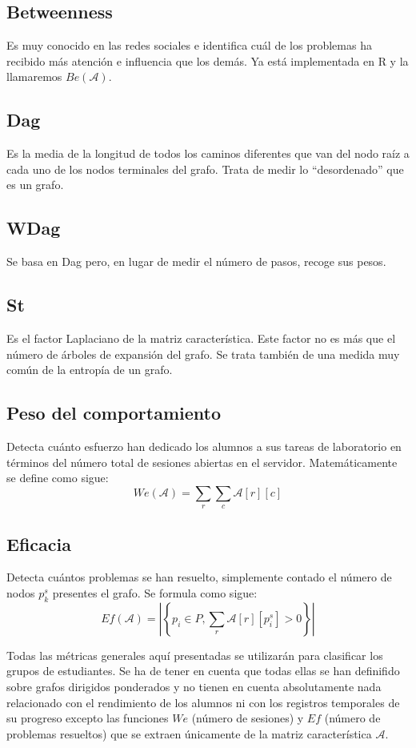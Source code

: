 \subsection{Betweenness}
Es muy conocido en las redes sociales e identifica cuál de los problemas ha recibido más atención e influencia que los demás. Ya está implementada en R y la llamaremos $Be(\mathcal{A})$.
\subsection{Dag}
Es la media de la longitud de todos los caminos diferentes que van del nodo raíz a cada uno de los nodos terminales del grafo. Trata de medir lo ``desordenado'' que es un grafo.
\subsection{WDag}
Se basa en Dag pero, en lugar de medir el número de pasos, recoge sus pesos.
\subsection{St}
Es el factor Laplaciano de la matriz característica. Este factor no es más que el número de árboles de expansión del grafo. Se trata también de una medida muy común de la entropía de un grafo.
\subsection{Peso del comportamiento}
Detecta cuánto esfuerzo han dedicado los alumnos a sus tareas de laboratorio en términos del número total de sesiones abiertas en el servidor. Matemáticamente se define como sigue:
\begin{equation}
We(\mathcal{A}) = \sum_r \sum_c \mathcal{A}[r][c]
\end{equation}
\subsection{Eficacia}
Detecta cuántos problemas se han resuelto, simplemente contado el número de nodos $p_k^s$ presentes el grafo. Se formula como sigue:
\begin{equation}
Ef(\mathcal{A}) = \left|\left\lbrace p_i \in P, \sum_r \mathcal{A}[r][p_i^s] > 0 \right\rbrace\right|
\end{equation}

Todas las métricas generales aquí presentadas se utilizarán para clasificar los grupos de estudiantes. Se ha de tener en cuenta que todas ellas se han definifido sobre grafos dirigidos ponderados y no tienen en cuenta absolutamente nada relacionado con el rendimiento de los alumnos ni con los registros temporales de su progreso excepto las funciones $We$ (número de sesiones) y $Ef$ (número de problemas resueltos) que se extraen únicamente de la matriz característica $\mathcal{A}$.

